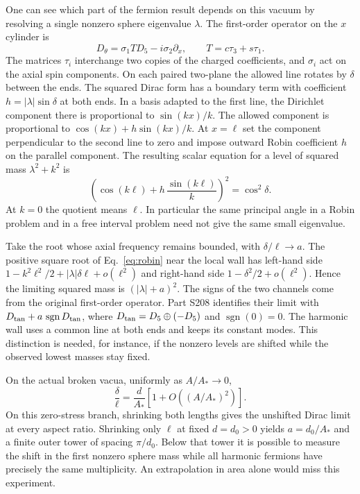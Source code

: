 \documentclass[aps,prd,reprint,onecolumn,nofootinbib,amsmath,amssymb]{revtex4-2}
\begin{document}
One can see which part of the fermion result depends on this vacuum by resolving a single nonzero sphere eigenvalue $\lambda$. The first-order operator on the $x$ cylinder is
\begin{equation}
 D_\theta=\sigma_1 T D_5-i\sigma_2\partial_x,\qquad
 T=c\tau_3+s\tau_1 .
\end{equation}
The matrices $\tau_i$ interchange two copies of the charged coefficients, and $\sigma_i$ act on the axial spin components. On each paired two-plane the allowed line rotates by $\delta$ between the ends. The squared Dirac form has a boundary term with coefficient $h=|\lambda|\sin\delta$ at both ends. In a basis adapted to the first line, the Dirichlet component there is proportional to $\sin(kx)/k$. The allowed component is proportional to $\cos(kx)+h\sin(kx)/k$. At $x=\ell$ set the component perpendicular to the second line to zero and impose outward Robin coefficient $h$ on the parallel component. The resulting scalar equation for a level of squared mass $\lambda^2+k^2$ is
\begin{equation}
 \left(\cos(k\ell)+h\,\frac{\sin(k\ell)}{k}\right)^2
      =\cos^2\delta .
 \label{eq:robin}
\end{equation}
At $k=0$ the quotient means $\ell$. In particular the same principal angle in a Robin problem and in a free interval problem need not give the same small eigenvalue.

Take the root whose axial frequency remains bounded, with $\delta/\ell\to a$. The positive square root of Eq.~\eqref{eq:robin} near the local wall has left-hand side $1-k^2\ell^2/2+|\lambda|\delta\ell+o(\ell^2)$ and right-hand side $1-\delta^2/2+o(\ell^2)$. Hence the limiting squared mass is $(|\lambda|+a)^2$. The signs of the two channels come from the original first-order operator. Part S208 identifies their limit with $D_{\rm tan}+a\,\operatorname{sgn}D_{\rm tan}$, where $D_{\rm tan}=D_5\oplus(-D_5)$ and $\operatorname{sgn}(0)=0$. The harmonic wall uses a common line at both ends and keeps its constant modes. This distinction is needed, for instance, if the nonzero levels are shifted while the observed lowest masses stay fixed.

On the actual broken vacua, uniformly as $A/A_*\to0$,
\begin{equation}
 \frac{\delta}{\ell}=\frac{d}{A_*}
       \left[1+O\!\left((A/A_*)^2\right)\right].
 \label{eq:wallrate}
\end{equation}
On this zero-stress branch, shrinking both lengths gives the unshifted Dirac limit at every aspect ratio. Shrinking only $\ell$ at fixed $d=d_0>0$ yields $a=d_0/A_*$ and a finite outer tower of spacing $\pi/d_0$. Below that tower it is possible to measure the shift in the first nonzero sphere mass while all harmonic fermions have precisely the same multiplicity. An extrapolation in area alone would miss this experiment.
\end{document}
